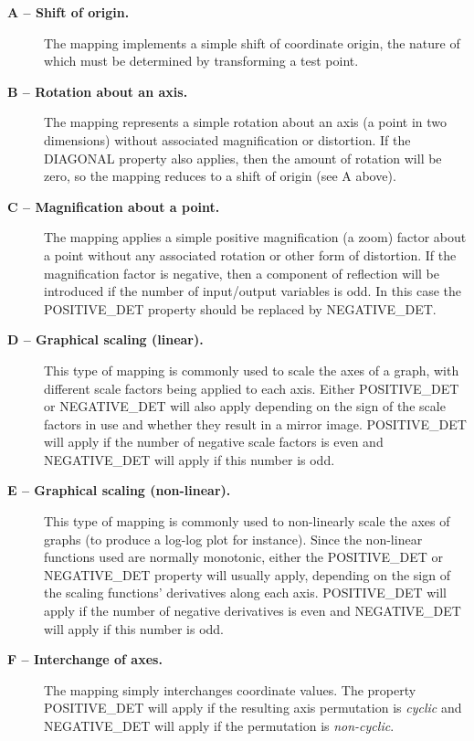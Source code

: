 \documentclass[twoside,nolof,11pt]{starlink}
\providecommand{\name}[1]{\small{#1}}
\begin{document}
\begin{description}

\item[\textbf{A -- Shift of origin.}] The mapping implements a simple shift of
coordinate origin, the nature of which must be determined by transforming a
test point.

\item[\textbf{B -- Rotation about an axis.}] The mapping represents a
simple rotation about an axis (a point in two dimensions) without
associated magnification or distortion.
If the \name{DIAGONAL} property also applies, then the amount of rotation
will be zero, so the mapping reduces to a shift of origin (see A above).

\item[\textbf{C -- Magnification about a point.}] The mapping applies a
simple positive magnification (a zoom) factor about a point without any
associated rotation or other form of distortion.
If the magnification factor is negative, then a component of reflection will
be introduced if the number of input/output variables is odd.
In this case the \name{POSITIVE\_DET} property should be replaced by
\name{NEGATIVE\_DET}.

\item[\textbf{D -- Graphical scaling (linear).}] This type of mapping is
commonly used to scale the axes of a graph, with different scale factors
being applied to each axis.
Either \name{POSITIVE\_DET} or \name{NEGATIVE\_DET} will also apply depending
on the sign of the scale factors in use and whether they result in a mirror
image.
\name{POSITIVE\_DET} will apply if the number of negative scale factors is
even and \name{NEGATIVE\_DET} will apply if this number is odd.

\item[\textbf{E -- Graphical scaling (non-linear).}] This type of mapping is
commonly used to non-linearly scale the axes of graphs (to produce a
log-log plot for instance).
Since the non-linear functions used are normally monotonic, either the
\name{POSITIVE\_DET} or \name{NEGATIVE\_DET} property will usually apply,
depending on the sign of the scaling functions' derivatives along each axis.
\name{POSITIVE\_DET} will apply if the number of negative derivatives is
even and \name{NEGATIVE\_DET} will apply if this number is odd.

\item[\textbf{F -- Interchange of axes.}] The mapping simply interchanges
coordinate values.
The property \name{POSITIVE\_DET} will apply if the resulting axis
permutation is \emph{cyclic} and \name{NEGATIVE\_DET} will apply if the
permutation is \emph{non-cyclic}.


\end{description}
\end{document}
